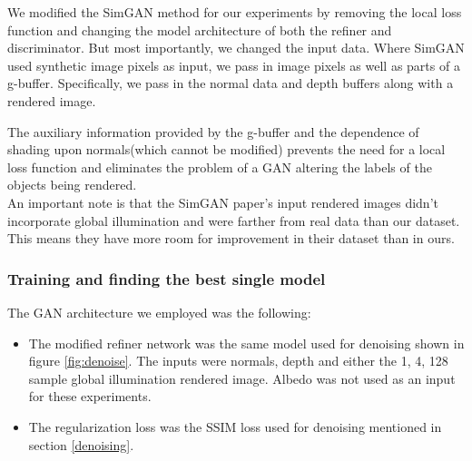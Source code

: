 \documentclass[10pt,twocolumn,letterpaper]{article}
\begin{document}
We modified the SimGAN method for our experiments by removing the local loss function and changing the model architecture of both the refiner and discriminator.  But most importantly, we changed the input data.  Where SimGAN used synthetic image pixels as input, we pass in image pixels as well as parts of a g-buffer. Specifically, we pass in the normal data and depth buffers along with a rendered image.  

The auxiliary information provided by the g-buffer and the dependence of shading upon normals(which cannot be modified) 
prevents the need for a local loss function and eliminates the problem of a GAN altering the labels of the objects being rendered.\\

An important note is that the SimGAN paper's input rendered images didn't incorporate global illumination and were farther from real data than our dataset. This means they have more room for improvement in their dataset than in ours.  


\subsubsection{Training and finding the best single model} \label{sec:gans}
The GAN architecture we employed was the following:\\
\begin{itemize}
\item The modified refiner network was the same model used for denoising shown in figure \ref{fig:denoise}.  The inputs were normals, depth and either the 1, 4, 128 sample global illumination rendered image. Albedo was not used as an input for these experiments.
\item The regularization loss was the SSIM loss used for denoising mentioned in section \ref{denoising}.
\end{itemize}
\end{document}

